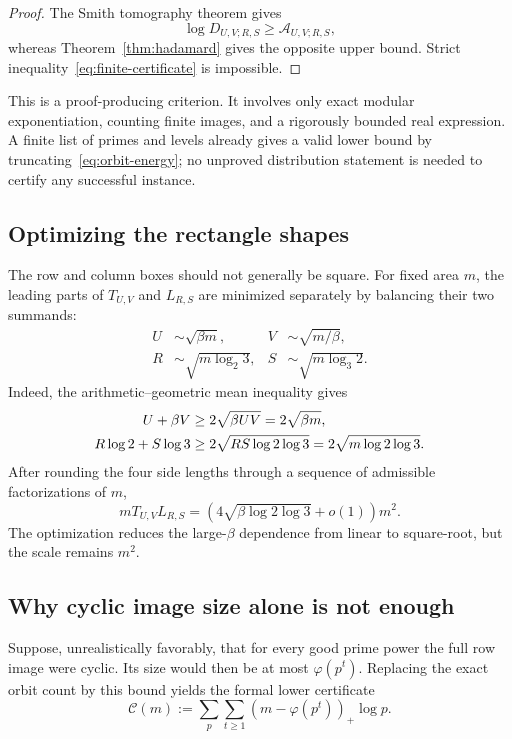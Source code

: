 \documentclass[11pt]{article}
\theoremstyle{definition}
\theoremstyle{remark}
\begin{document}
\begin{proof}
The Smith tomography theorem gives
\[
 \log D_{U,V;R,S}\ge \mathscr A_{U,V;R,S},
\]
whereas Theorem~\ref{thm:hadamard} gives the opposite upper bound.  Strict inequality~\eqref{eq:finite-certificate} is impossible.
\end{proof}

This is a proof-producing criterion.  It involves only exact modular exponentiation, counting finite images, and a rigorously bounded real expression.  A finite list of primes and levels already gives a valid lower bound by truncating~\eqref{eq:orbit-energy}; no unproved distribution statement is needed to certify any successful instance.

\subsection{Optimizing the rectangle shapes}

The row and column boxes should not generally be square.  For fixed area $m$, the leading parts of $T_{U,V}$ and $L_{R,S}$ are minimized separately by balancing their two summands:
\begin{align}
 U&\sim\sqrt{\beta m},& V&\sim\sqrt{m/\beta},\label{eq:row-opt}\\
 R&\sim\sqrt{m\log_2 3},&
 S&\sim\sqrt{m\log_3 2}.\label{eq:col-opt}
\end{align}
Indeed, the arithmetic--geometric mean inequality gives
\begin{align}
 U+\beta V&\ge2\sqrt{\beta UV}=2\sqrt{\beta m},\notag\\
 R\log2+S\log3&\ge2\sqrt{RS\log2\log3}
 =2\sqrt{m\log2\log3}.
\end{align}
After rounding the four side lengths through a sequence of admissible factorizations of $m$,
\begin{equation}
 mT_{U,V}L_{R,S}
 =\left(4\sqrt{\beta\log2\log3}+o(1)\right)m^2.
 \label{eq:optimized-hadamard}
\end{equation}
The optimization reduces the large-$\beta$ dependence from linear to square-root, but the scale remains $m^2$.

\subsection{Why cyclic image size alone is not enough}

Suppose, unrealistically favorably, that for every good prime power the full row image were cyclic.  Its size would then be at most $\varphi(p^t)$.  Replacing the exact orbit count by this bound yields the formal lower certificate
\begin{equation}
 \mathscr C(m)
 :=\sum_p\sum_{t\ge1}(m-\varphi(p^t))_+\log p.
 \label{eq:cyclic-cardinality-certificate}
\end{equation}
\end{document}
